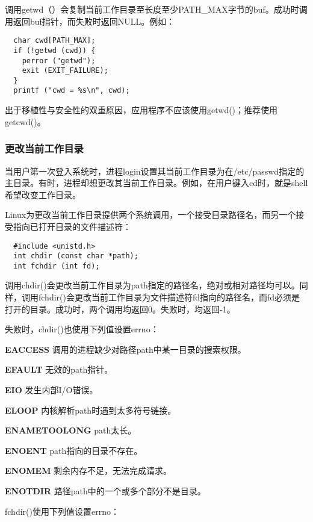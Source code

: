 调用getwd（）会复制当前工作目录至长度至少PATH\_MAX字节的buf。成功时调用返回buf指针，而失败时返回NULL。例如：

\begin{lstlisting}
  char cwd[PATH_MAX];
  if (!getwd (cwd)) {
    perror ("getwd");
    exit (EXIT_FAILURE);
  }
  printf ("cwd = %s\n", cwd);
\end{lstlisting}

出于移植性与安全性的双重原因，应用程序不应该使用getwd()；推荐使用getcwd()。

\subsubsection{更改当前工作目录}

当用户第一次登入系统时，进程login设置其当前工作目录为在/etc/passwd指定的主目录。有时，进程却想更改其当前工作目录。例如，在用户键入cd时，就是shell希望改变工作目录。 

Linux为更改当前工作目录提供两个系统调用，一个接受目录路径名，而另一个接受指向已打开目录的文件描述符：

\begin{lstlisting}
  #include <unistd.h>
  int chdir (const char *path);
  int fchdir (int fd);
\end{lstlisting}

调用chdir()会更改当前工作目录为path指定的路径名，绝对或相对路径均可以。同样，调用fchdir()会更改当前工作目录为文件描述符fd指向的路径名，而fd必须是打开的目录。成功时，两个调用均返回0。失败时，均返回-1。

失败时，chdir()也使用下列值设置errno：

\begin{eqlist*}
\item[\textbf{EACCESS}] 调用的进程缺少对路径path中某一目录的搜索权限。
\item[\textbf{EFAULT}] 无效的path指针。
\item[\textbf{EIO}] 发生内部I/O错误。
\item[\textbf{ELOOP}] 内核解析path时遇到太多符号链接。
\item[\textbf{ENAMETOOLONG}] path太长。
\item[\textbf{ENOENT}] path指向的目录不存在。
\item[\textbf{ENOMEM}] 剩余内存不足，无法完成请求。
\item[\textbf{ENOTDIR}] 路径path中的一个或多个部分不是目录。
\end{eqlist*}

fchdir()使用下列值设置errno：


